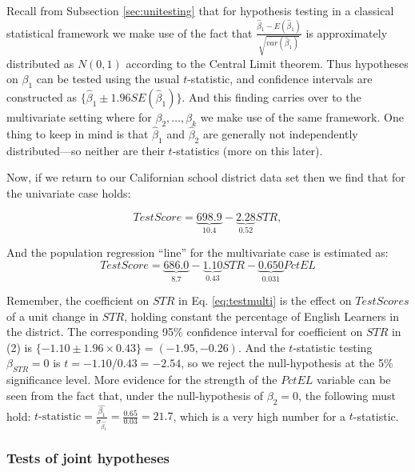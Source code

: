 \documentclass[
]{book}
\begin{document}
Recall from Subsection \ref{sec:unitesting} that for hypothesis testing in a classical statistical framework we make use of the fact that \(\frac{\hat{\beta}_1- E(\hat{\beta}_1)}{\sqrt{var(\hat{\beta}_1)}}\) is approximately distributed as \(N(0,1)\) according to the Central Limit theorem. Thus hypotheses on \(\beta_1\) can be tested using the usual \(t\)-statistic, and confidence intervals are constructed as \(\{\hat{\beta}_1 \pm 1.96 SE (\hat{\beta}_1)\}\). And this finding carries over to the multivariate setting where for \(\beta_2,\ldots, \beta_k\) we make use of the same framework. One thing to keep in mind is that \(\hat{\beta}_1\) and \(\hat{\beta}_2\) are generally not independently distributed---so neither are their \(t\)-statistics (more on this later).

Now, if we return to our Californian school district data set then we find that for the univariate case holds:

\begin{equation}
TestScore =\underbrace{698.9}_{10.4} - \underbrace{2.28}_{0.52}  STR, 
\end{equation}

And the population regression ``line'' for the multivariate case is estimated as:
\begin{equation}
TestScore = \underbrace{686.0}_{8.7} - \underbrace{1.10}_{0.43} STR - \underbrace{0.650}_{0.031} PctEL
    \label{eq:testmulti}
\end{equation}

Remember, the coefficient on \(STR\) in Eq. \eqref{eq:testmulti} is the effect on \(TestScores\) of a unit change in \(STR\), holding constant the percentage of English Learners in the district. The corresponding 95\% confidence interval for coefficient on \(STR\) in (2) is \(\{-1.10 \pm 1.96 \times 0.43\} = (-1.95,-0.26)\). And the \(t\)-statistic testing \(\beta_{STR} = 0\) is \(t = -1.10/0.43 = -2.54\), so we reject the null-hypothesis at the 5\% significance level. More evidence for the strength of the \(PctEL\) variable can be seen from the fact that, under the null-hypothesis of \(\beta_2 = 0\), the following must hold: \(t\text{-statistic} = \frac{\hat{\beta_1}}{\sigma_{\hat{\beta_1}}} = \frac{0.65}{0.03} = 21.7\), which is a very high number for a \(t\)-statistic.

\hypertarget{tests-of-joint-hypotheses}{%
\subsubsection{Tests of joint hypotheses}\label{tests-of-joint-hypotheses}}
\end{document}
